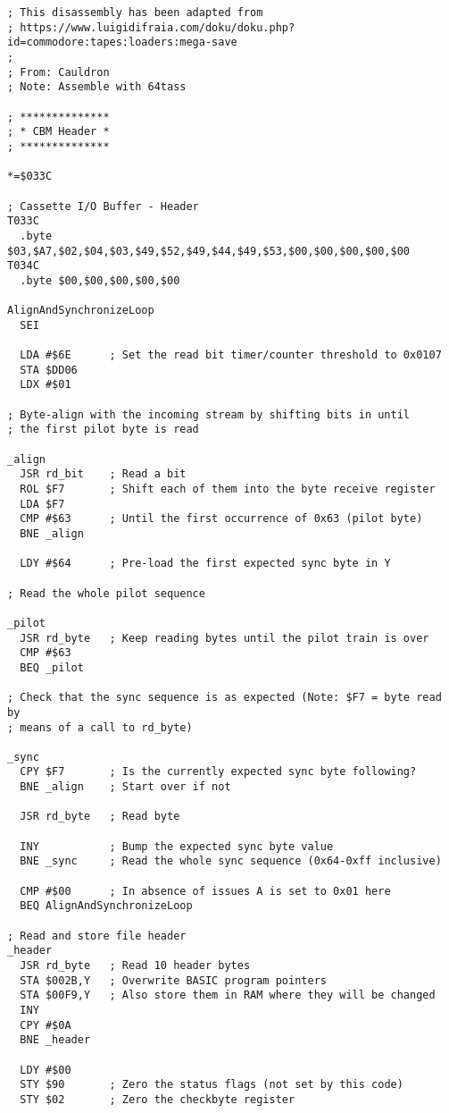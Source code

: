 \begin{minipage}[b]{0.50\linewidth}
\centering
\begin{lstlisting}[basicstyle=\tiny\ttfamily]
; This disassembly has been adapted from
; https://www.luigidifraia.com/doku/doku.php?id=commodore:tapes:loaders:mega-save
;
; From: Cauldron 
; Note: Assemble with 64tass
 
; **************
; * CBM Header *
; **************
 
*=$033C

; Cassette I/O Buffer - Header
T033C
  .byte $03,$A7,$02,$04,$03,$49,$52,$49,$44,$49,$53,$00,$00,$00,$00,$00
T034C
  .byte $00,$00,$00,$00,$00

AlignAndSynchronizeLoop
  SEI           

  LDA #$6E      ; Set the read bit timer/counter threshold to 0x0107
  STA $DD06     
  LDX #$01      

; Byte-align with the incoming stream by shifting bits in until
; the first pilot byte is read

_align
  JSR rd_bit    ; Read a bit
  ROL $F7       ; Shift each of them into the byte receive register
  LDA $F7       
  CMP #$63      ; Until the first occurrence of 0x63 (pilot byte)
  BNE _align    

  LDY #$64      ; Pre-load the first expected sync byte in Y

; Read the whole pilot sequence

_pilot
  JSR rd_byte   ; Keep reading bytes until the pilot train is over
  CMP #$63      
  BEQ _pilot    

; Check that the sync sequence is as expected (Note: $F7 = byte read by
; means of a call to rd_byte)

_sync
  CPY $F7       ; Is the currently expected sync byte following?
  BNE _align    ; Start over if not

  JSR rd_byte   ; Read byte

  INY           ; Bump the expected sync byte value
  BNE _sync     ; Read the whole sync sequence (0x64-0xff inclusive)

  CMP #$00      ; In absence of issues A is set to 0x01 here
  BEQ AlignAndSynchronizeLoop     

; Read and store file header
_header
  JSR rd_byte   ; Read 10 header bytes
  STA $002B,Y   ; Overwrite BASIC program pointers
  STA $00F9,Y   ; Also store them in RAM where they will be changed
  INY           
  CPY #$0A      
  BNE _header   

  LDY #$00      
  STY $90       ; Zero the status flags (not set by this code)
  STY $02       ; Zero the checkbyte register
\end{lstlisting}
\end{minipage}
